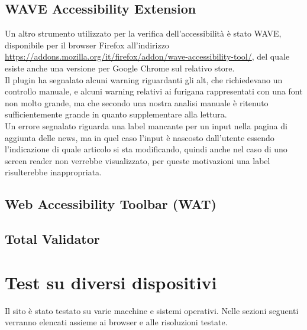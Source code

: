 \documentclass[openany, a4paper, 12pt]{report}
\begin{document}
			\subsection{WAVE Accessibility Extension}
				Un altro strumento utilizzato per la verifica dell'accessibilità è stato WAVE, disponibile per il browser Firefox all'indirizzo \url{https://addons.mozilla.org/it/firefox/addon/wave-accessibility-tool/}, del quale esiste anche una versione per Google Chrome sul relativo store.\\
				Il plugin ha segnalato alcuni warning riguardanti gli alt, che richiedevano un controllo manuale, e alcuni warning relativi ai furigana rappresentati con una font non molto grande, ma che secondo una nostra analisi manuale è ritenuto sufficientemente grande in quanto supplementare alla lettura.\\
				Un errore segnalato riguarda una label mancante per un input nella pagina di aggiunta delle news, ma in quel caso l'input è nascosto dall'utente essendo l'indicazione di quale articolo si sta modificando, quindi anche nel caso di uno screen reader non verrebbe visualizzato, per queste motivazioni una label risulterebbe inappropriata.
			\subsection{Web Accessibility Toolbar (WAT)}
			
			\subsection{Total Validator}
			
		\section{Test su diversi dispositivi}
			Il sito è stato testato su varie macchine e sistemi operativi. Nelle sezioni seguenti verranno elencati assieme ai browser e alle risoluzioni testate.
\end{document}
